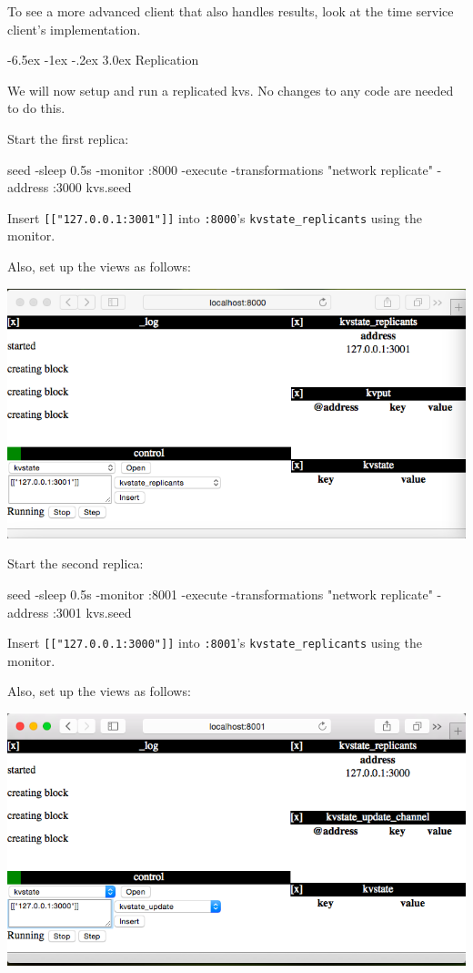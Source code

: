 \documentclass[a5paper,12pt,onecolumn]{article}
\makeatletter
\def\code#1{\mbox{\lstinline{#1}}}
\renewcommand\section{\@startsection {section}{1}{\z@}%
	{-6.5ex \@plus -1ex \@minus -.2ex}%
	{3.0ex}%
	{\sf\Large}}
\makeatother
\begin{document}
To see a more advanced client that also handles results, look at the time service client's implementation.

\section{Replication}

We will now setup and run a replicated kvs. No changes to any code are needed to do this.

Start the first replica:

\begin{cli}
seed -sleep 0.5s -monitor :8000 -execute -transformations "network  replicate" -address :3000 kvs.seed
\end{cli}

Insert \code{[["127.0.0.1:3001"]]} into \code{:8000}'s \code{kvstate_replicants} using the monitor.

Also, set up the views as follows:

\includegraphics{replicate/first.png}

Start the second replica:

\begin{cli}
seed -sleep 0.5s -monitor :8001 -execute -transformations "network  replicate" -address :3001 kvs.seed
\end{cli}

Insert \code{[["127.0.0.1:3000"]]} into \code{:8001}'s \code{kvstate_replicants} using the monitor.

Also, set up the views as follows:

\includegraphics{replicate/second.png}
\end{document}
